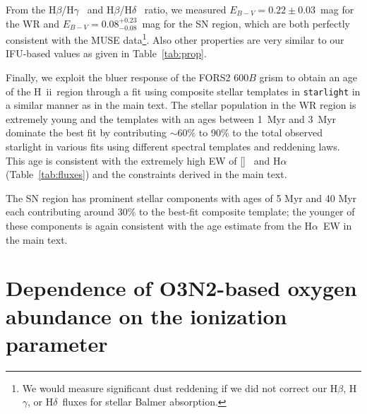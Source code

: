 \documentclass[traditabstract]{aa}
\newcommand{\hb}{H$\beta$}
\newcommand{\ha}{H$\alpha$}
\newcommand{\hg}{H$\gamma$}
\newcommand{\hd}{H$\delta$}
\newcommand{\hii}{\mbox{H~{\sc ii}}}
\newcommand{\oiii}{[\ion{O}{iii}]}
\begin{document}
\begin{appendix}
From the \hb/\hg~ and \hb/\hd~ ratio, we measured $E_{B-V}=0.22\pm0.03$~mag for the WR and $E_{B-V}=0.08_{-0.08}^{+0.23}$~mag for the SN region, which are both perfectly consistent with the MUSE data\footnote{We would measure significant dust reddening if we did not correct our \hb, \hg, or \hd~fluxes for stellar Balmer absorption.}. Also other properties are very similar to our IFU-based values as given in Table~\ref{tab:prop}.

Finally, we exploit the bluer response of the FORS2 600$B$ grism to obtain an age of the \hii~region through a fit using composite stellar templates in \texttt{starlight} in a similar manner as in the main text. The stellar population in the WR region is extremely young and the \citet{2003MNRAS.344.1000B} templates with an ages between 1~Myr and 3~Myr dominate the best fit by contributing $\sim$60\% to 90\% to the total observed starlight in various fits using different spectral templates and reddening laws. This age is consistent with the extremely high EW of \oiii~ and \ha~ (Table~\ref{tab:fluxes}) and the constraints derived in the main text.

The SN region has prominent stellar components with ages of 5 Myr and 40 Myr each contributing around 30\% to the best-fit composite template; the younger of these components is again consistent with the age estimate from the \ha~EW in the main text.

\section{Dependence of O3N2-based oxygen abundance on the ionization parameter}
\label{sec:abundancevsion}


\end{appendix}
\end{document}

